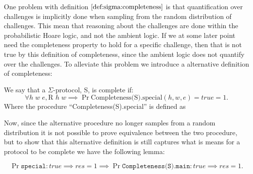 One problem with definition $\ref{def:sigma:completeness}$ is that
quantification over challenges is implicitly done when sampling from the random
distribution of challenges. This mean that reasoning about the challenges are
done within the probabilistic Hoare logic, and not the ambient logic. If we at
some later point need the completeness property to hold for a specific
challenge, then that is not true by this definition of completeness, since
the ambient logic does not quantify over the challenges. To alleviate this
problem we introduce a alternative definition of completeness:

\begin{definition}
\label{def:sigma:alt_completeness}
  We say that a $\Sigma$-protocol, S, is complete if:
  \begin{equation}
    \label{eq:sigma_completeness}
    \forall h \; w \; e, \text{R } h \; w \implies \Pr{\text{Completeness(S).special}(h,w,e) = true} = 1.
  \end{equation}
  Where the procedure ``Completeness(S).special'' is defined as
  
\end{definition}

Now, since the alternative procedure no longer samples from a random
distribution it is not possible to prove equivalence between the two procedure,
but to show that this alternative definition is still captures what is means for
a protocol to be complete we have the following lemma:

\begin{lemma}
  \label{lem:sigma:alt:completeness}
\begin{equation*}
  \Pr{\texttt{special} : true \implies res} = 1 \implies
  \Pr{\texttt{Completeness(S).main} : true \implies res} = 1.
\end{equation*}
\end{lemma}

